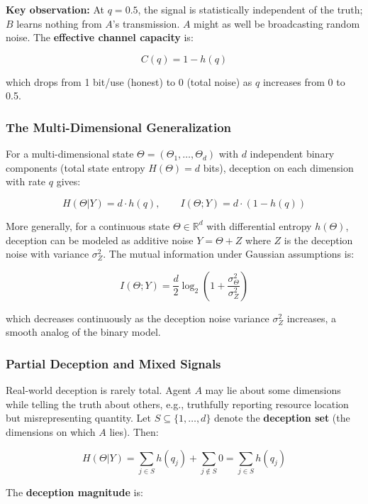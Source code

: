 \documentclass[11pt]{article}
\theoremstyle{plain}
\theoremstyle{definition}
\theoremstyle{remark}
\let\origsubsubsection\subsubsection
\renewcommand{\subsubsection}{\needspace{4\baselineskip}\origsubsubsection}
\begin{document}
\textbf{Key observation:} At \(q = 0.5\), the signal is statistically
independent of the truth; \(B\) learns nothing from \(A\)'s
transmission. \(A\) might as well be broadcasting random noise. The
\textbf{effective channel capacity} is:

\[C(q) = 1 - h(q)\]

which drops from 1 bit/use (honest) to 0 (total noise) as \(q\)
increases from 0 to 0.5.

\subsubsection{The Multi-Dimensional
Generalization}\label{the-multi-dimensional-generalization}

For a multi-dimensional state \(\Theta = (\Theta_1, \ldots, \Theta_d)\)
with \(d\) independent binary components (total state entropy
\(H(\Theta) = d\) bits), deception on each dimension with rate \(q\)
gives:

\[H(\Theta | Y) = d \cdot h(q), \qquad I(\Theta; Y) = d \cdot (1 - h(q))\]

More generally, for a continuous state \(\Theta \in \mathbb{R}^d\) with
differential entropy \(h(\Theta)\), deception can be modeled as additive
noise \(Y = \Theta + Z\) where \(Z\) is the deception noise with
variance \(\sigma_Z^2\). The mutual information under Gaussian
assumptions is:

\[I(\Theta; Y) = \frac{d}{2} \log_2\left(1 + \frac{\sigma_\Theta^2}{\sigma_Z^2}\right)\]

which decreases continuously as the deception noise variance
\(\sigma_Z^2\) increases, a smooth analog of the binary model.

\subsubsection{Partial Deception and Mixed
Signals}\label{partial-deception-and-mixed-signals}

Real-world deception is rarely total. Agent \(A\) may lie about some
dimensions while telling the truth about others, e.g., truthfully
reporting resource location but misrepresenting quantity. Let
\(S \subseteq \{1, \ldots, d\}\) denote the \textbf{deception set} (the
dimensions on which \(A\) lies). Then:

\[H(\Theta | Y) = \sum_{j \in S} h(q_j) + \sum_{j \notin S} 0 = \sum_{j \in S} h(q_j)\]

The \textbf{deception magnitude} is:
\end{document}
